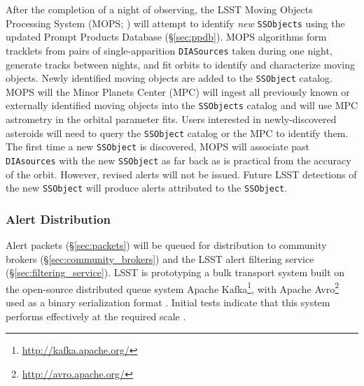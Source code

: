 After the completion of a night of observing,
the LSST Moving Objects Processing System (MOPS; ) will attempt to identify \textit{new} \texttt{SSObjects} using the updated Prompt Products Database (\S \ref{sec:ppdb}).
MOPS algorithms form tracklets from pairs of single-apparition \texttt{DIASources} taken during one night, generate tracks between nights, and fit orbits to identify and characterize moving objects.
Newly identified moving objects are added to the {\tt SSObject} catalog.
MOPS will  the Minor Planets Center (MPC) will ingest all previously known or externally identified moving objects into the {\tt SSObjects} catalog\oldtext{,}\newtext{;} and will use MPC astrometry in the orbital parameter fits.
Users interested in newly-discovered asteroids will need to query the \texttt{SSObject} catalog or the MPC to identify them.
The first time a new \texttt{SSObject} is discovered, MOPS will associate past \texttt{DIAsources} with the new \texttt{SSObject} as far back as is practical from the accuracy of the orbit.
However, revised alerts will not be issued.
Future LSST detections of the new \texttt{SSObject} will produce alerts attributed to the \texttt{SSObject}.


\subsubsection{Alert Distribution} \label{sec:alert_distribution}

Alert packets (\S \ref{sec:packets}) will be queued for distribution to community brokers (\S \ref{sec:community_brokers}) and the LSST alert filtering service (\S \ref{sec:filtering_service}).
LSST is prototyping  a bulk transport system built on the open-source distributed queue system Apache Kafka\footnote{\url{http://kafka.apache.org/}}, with Apache Avro\footnote{\url{http://avro.apache.org/}} used as a binary serialization format .
Initial tests indicate that this system performs effectively at the required scale .


